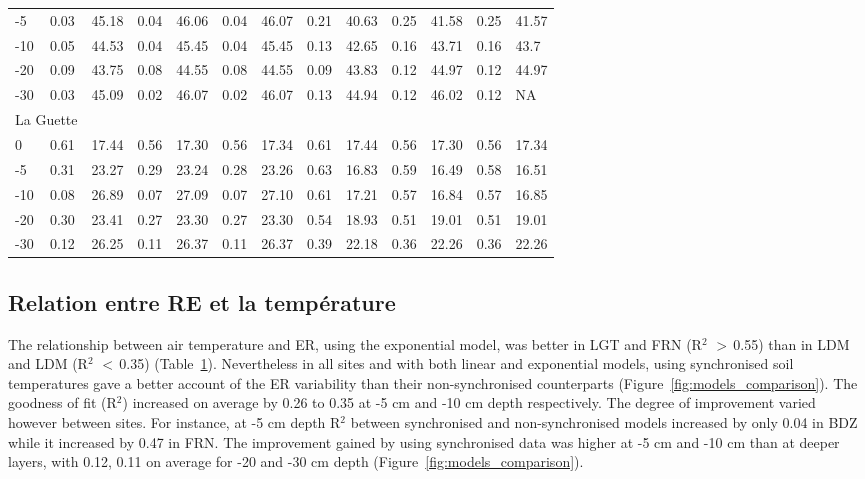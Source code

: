 \begin{table}
\begin{tabular}{lllllllllllll}
-5 & 0.03 & 45.18 & 0.04 & 46.06 & 0.04 & 46.07 & 0.21 & 40.63 & 0.25 & 41.58 & 0.25 & 41.57\\[-1ex] 
-10 & 0.05 & 44.53 & 0.04 & 45.45 & 0.04 & 45.45 & 0.13 & 42.65 & 0.16 & 43.71 & 0.16 & 43.7\\[-1ex] 
-20 & 0.09 & 43.75 & 0.08 & 44.55 & 0.08 & 44.55 & 0.09 & 43.83 & 0.12 & 44.97 & 0.12 & 44.97\\[-1ex] 
-30 & 0.03 & 45.09 & 0.02 & 46.07 & 0.02 & 46.07 & 0.13 & 44.94 & 0.12 & 46.02 & 0.12 & NA\\
\multicolumn{2}{l}{La Guette} & & & & & & & & & & & \\[-1ex]
0 & 0.61 & 17.44 & 0.56 & 17.30 & 0.56 & 17.34 & 0.61 & 17.44 & 0.56 & 17.30 & 0.56 & 17.34\\[-1ex] 
-5 & 0.31 & 23.27 & 0.29 & 23.24 & 0.28 & 23.26 & 0.63 & 16.83 & 0.59 & 16.49 & 0.58 & 16.51\\[-1ex] 
-10 & 0.08 & 26.89 & 0.07 & 27.09 & 0.07 & 27.10 & 0.61 & 17.21 & 0.57 & 16.84 & 0.57 & 16.85\\[-1ex] 
-20 & 0.30 & 23.41 & 0.27 & 23.30 & 0.27 & 23.30 & 0.54 & 18.93 & 0.51 & 19.01 & 0.51 & 19.01\\[-1ex] 
-30 & 0.12 & 26.25 & 0.11 & 26.37 & 0.11 & 26.37 & 0.39 & 22.18 & 0.36 & 22.26 & 0.36 & 22.26\\
\hline
\end{tabular} 
\label{table:mod_R2_RMSE}
\end{table}

\subsection{Relation entre RE et la température}


The relationship between air temperature and ER, using the exponential model, was better in LGT and FRN (R$^{2}$ $>$\,0.55) than in LDM and LDM (R$^{2}$ $<$\,0.35) (Table~\ref{table:mod_R2_RMSE}).
Nevertheless in all sites and with both linear and exponential models, using synchronised  soil temperatures gave a better account of the ER variability than their non-synchronised counterparts (Figure~\ref{fig:models_comparison}).
The goodness of fit (R$^2$) increased on average by 0.26 to 0.35 at -5 cm and -10 cm depth respectively.
The degree of improvement varied however between sites.
For instance, at -5 cm depth R$^2$ between synchronised and non-synchronised models increased by only 0.04 in BDZ while it increased by 0.47 in FRN.
The improvement gained by using synchronised data was higher at -5 cm and -10 cm than at deeper layers, with 0.12, 0.11 on average for -20 and -30 cm depth (Figure~\ref{fig:models_comparison}).

